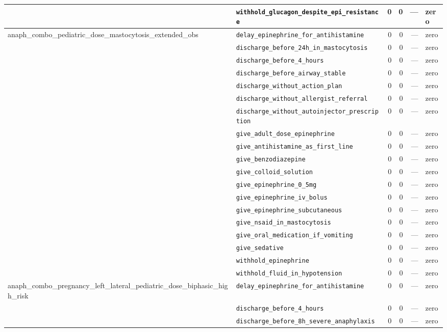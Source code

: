 \begin{table}[ht]
\begin{tabular}{llrrrl}
 & \texttt{withhold\_glucagon\_despite\_epi\_resistance} & 0 & 0 & — & zero \\
\midrule
anaph\_combo\_pediatric\_dose\_mastocytosis\_extended\_obs & \texttt{delay\_epinephrine\_for\_antihistamine} & 0 & 0 & — & zero \\
 & \texttt{discharge\_before\_24h\_in\_mastocytosis} & 0 & 0 & — & zero \\
 & \texttt{discharge\_before\_4\_hours} & 0 & 0 & — & zero \\
 & \texttt{discharge\_before\_airway\_stable} & 0 & 0 & — & zero \\
 & \texttt{discharge\_without\_action\_plan} & 0 & 0 & — & zero \\
 & \texttt{discharge\_without\_allergist\_referral} & 0 & 0 & — & zero \\
 & \texttt{discharge\_without\_autoinjector\_prescription} & 0 & 0 & — & zero \\
 & \texttt{give\_adult\_dose\_epinephrine} & 0 & 0 & — & zero \\
 & \texttt{give\_antihistamine\_as\_first\_line} & 0 & 0 & — & zero \\
 & \texttt{give\_benzodiazepine} & 0 & 0 & — & zero \\
 & \texttt{give\_colloid\_solution} & 0 & 0 & — & zero \\
 & \texttt{give\_epinephrine\_0\_5mg} & 0 & 0 & — & zero \\
 & \texttt{give\_epinephrine\_iv\_bolus} & 0 & 0 & — & zero \\
 & \texttt{give\_epinephrine\_subcutaneous} & 0 & 0 & — & zero \\
 & \texttt{give\_nsaid\_in\_mastocytosis} & 0 & 0 & — & zero \\
 & \texttt{give\_oral\_medication\_if\_vomiting} & 0 & 0 & — & zero \\
 & \texttt{give\_sedative} & 0 & 0 & — & zero \\
 & \texttt{withhold\_epinephrine} & 0 & 0 & — & zero \\
 & \texttt{withhold\_fluid\_in\_hypotension} & 0 & 0 & — & zero \\
\midrule
anaph\_combo\_pregnancy\_left\_lateral\_pediatric\_dose\_biphasic\_high\_risk & \texttt{delay\_epinephrine\_for\_antihistamine} & 0 & 0 & — & zero \\
 & \texttt{discharge\_before\_4\_hours} & 0 & 0 & — & zero \\
 & \texttt{discharge\_before\_8h\_severe\_anaphylaxis} & 0 & 0 & — & zero \\

\end{tabular}
\end{table}
